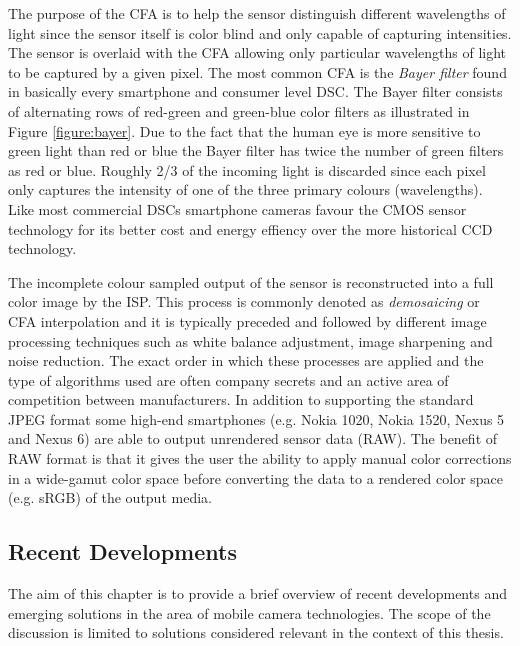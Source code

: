 \documentclass[thesis.tex]{subfiles}
\begin{document}
The purpose of the CFA is to help the sensor distinguish different wavelengths of light since the sensor itself is color blind and only capable of capturing intensities. The sensor is overlaid with the CFA allowing only particular wavelengths of light to be captured by a given pixel. The most common CFA is the \textit{Bayer filter} found in basically every smartphone and consumer level DSC. The Bayer filter consists of alternating rows of red-green and green-blue color filters as illustrated in Figure \ref{figure:bayer}. Due to the fact that the human eye is more sensitive to green light than red or blue the Bayer filter has twice the number of green filters as red or blue. Roughly 2/3 of the incoming light is discarded since each pixel only captures the intensity of one of the three primary colours (wavelengths). Like most commercial DSCs smartphone cameras favour the CMOS sensor technology for its better cost and energy effiency over the more historical CCD technology.

The incomplete colour sampled output of the sensor is reconstructed into a full color image by the ISP. This process is commonly denoted as \textit{demosaicing} or CFA interpolation and it is typically preceded and followed by different image processing techniques such as white balance adjustment, image sharpening and noise reduction. The exact order in which these processes are applied and the type of algorithms used are often company secrets and an active area of competition between manufacturers. In addition to supporting the standard JPEG format some high-end smartphones (e.g. Nokia 1020, Nokia 1520, Nexus 5 and Nexus 6) are able to output unrendered sensor data (RAW). The benefit of RAW format is that it gives the user the ability to apply manual color corrections in a wide-gamut color space before converting the data to a rendered color space (e.g. sRGB) of the output media.

\subsection{Recent Developments}\label{chapter:solutions}

The aim of this chapter is to provide a brief overview of recent developments and emerging solutions in the area of mobile camera technologies. The scope of the discussion is limited to solutions considered relevant in the context of this thesis.
\end{document}
